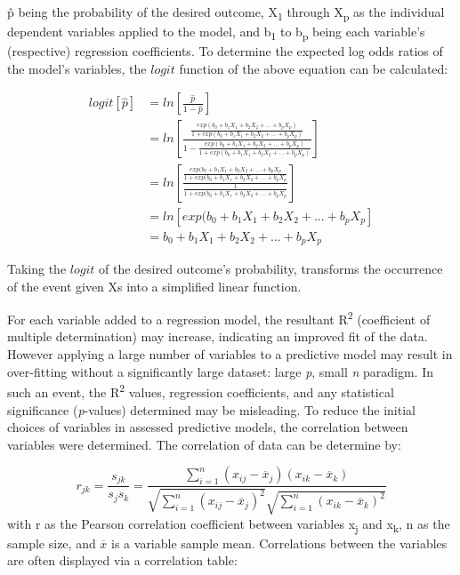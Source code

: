 \^{p} being the probability of the desired outcome, X\textsubscript{1} through X\textsubscript{p} as the individual dependent variables applied to the model, and b\textsubscript{1} to b\textsubscript{p} being each variable's (respective) regression coefficients. 
To determine the expected log odds ratios of the model's variables, the $logit$ function of the above equation can be calculated:

\begin{equation}
\begin{aligned}
logit[\hat{p}] & = ln[\frac{\hat{p}}{1-\hat{p}}] \\
			   & = ln\left[\frac{\frac{exp(b_0 + b_1 X_1 + b_2 X_2 + ... + b_p X_p)}{1 + exp(b_0 + b_1 X_1 + b_2 X_2 + ... + b_p X_p)}}{1 - \frac{exp(b_0 + b_1 X_1 + b_2 X_2 + ... + b_p X_p)}{1 + exp(b_0 + b_1 X_1 + b_2 X_2 + ... + b_p X_p)}}\right] \\
			   & = ln\left[\frac{\frac{exp(b_0 + b_1 X_1 + b_2 X_2 + ... + b_p X_p}{1 + exp(b_0 + b_1 X_1 + b_2 X_2 + ... + b_p X_p}}{\frac{1}{1 + exp(b_0 + b_1 X_1 + b_2 X_2 + ... + b_p X_p}}\right] \\
			   & = ln [ exp(b_0 + b_1 X_1 + b_2 X_2 + ... + b_p X_p] \\ 
			   & = b_0 + b_1 X_1 + b_2 X_2 + ... + b_p X_p
\end{aligned}
\end{equation}

Taking the $logit$ of the desired outcome's probability, transforms the occurrence of the event given Xs into a simplified linear function.

For each variable added to a regression model, the resultant R\textsuperscript{2} (coefficient of multiple determination) may increase, indicating an improved fit of the data. However applying a large number of variables to a predictive model may result in over-fitting without a significantly large dataset: large \textit{p}, small \textit{n} paradigm. In such an event, the R\textsuperscript{2} values, regression coefficients, and any statistical significance (\textit{p}-values) determined may be misleading. To reduce the initial choices of variables in assessed predictive models, the correlation between variables were determined. The correlation of data can be determine by:

\begin{equation}
r_{jk} = \frac{s_{jk}}{s_j s_k} = \frac{\sum_{i=1}^{n}(x_{ij} - \overline{x}_j)(x_{ik} - \overline{x}_k)}{\sqrt{\sum_{i=1}^{n}(x_{ij} - \overline{x}_j)^2}{\sqrt{\sum_{i=1}^{n}(x_{ik} - \overline{x}_k)^2}}}
\end{equation}
with r as the Pearson correlation coefficient between variables x\textsubscript{j} and x\textsubscript{k}, n as the sample size, and $\overline{x}$ is a variable sample mean. Correlations between the variables are often displayed via a correlation table:

